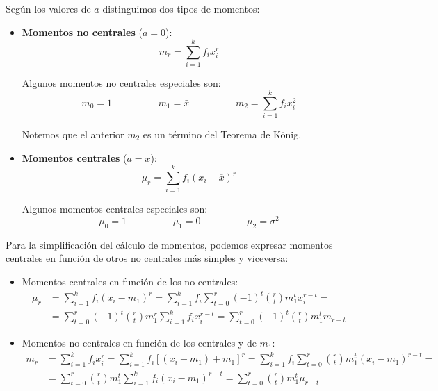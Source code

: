 Según los valores de $a$ distinguimos dos tipos de momentos:
\begin{itemize}
    \item \textbf{Momentos no centrales} ($a=0$):
        $$m_r = \sum_{i=1}^k f_i x_i^r$$

        Algunos momentos no centrales especiales son:
        $$m_0 = 1 \hspace{2cm} m_1 = \bar{x} \hspace{2cm} m_2 = \sum_{i=1}^k f_i x_i^2$$
\begin{observacion}
    Notemos que el anterior $m_2$ es un término del Teorema de König.
\end{observacion}

    \item \textbf{Momentos centrales} ($a=\overline{x}$):
        $$\mu_r = \sum_{i=1}^k f_i (x_i - \overline{x})^r$$

        Algunos momentos centrales especiales son:
        $$\mu_0 = 1 \hspace{2cm} \mu_1 = 0 \hspace{2cm} \mu_2 = \sigma^2$$
\end{itemize}


Para la simplificación del cálculo de momentos, podemos expresar momentos centrales en función de otros
no centrales más simples y viceversa:

\begin{itemize}
    \item Momentos centrales en función de los no centrales:
    \begin{equation*}
        \begin{split}
            \mu_r &= \sum_{i=1}^k f_i (x_i - m_1)^r = \sum_{i=1}^k f_i \sum_{t=0}^r (-1)^t \binom{r}{t} m_1^t x_i^{r-t}=\\
            &=\sum_{t=0}^r(-1)^t \binom{r}{t}m_1^r \sum_{i=1}^k f_i x_i^{r-t}=\sum_{t=0}^r (-1)^t \binom{r}{t}m_1^t m_{r-t}
        \end{split}
    \end{equation*}
    

    \item Momentos no centrales en función de los centrales y de $m_1$:
    \begin{equation*}
        \begin{split}
            m_r &= \sum_{i=1}^k f_ix_i^r=\sum_{i=1}^kf_i [(x_i-m_1)+m_1]^r = \sum_{i=1}^k f_i \sum_{t=0}^r \binom{r}{t}m_1^t (x_i - m_1)^{r-t}=\\
            &=\sum_{t=0}^r \binom{r}{t} m_1^t \sum_{i=1}^k f_i (x_i - m_1)^{r-t}=\sum_{t=0}^r \binom{r}{t} m_1^t \mu_{r-t}
        \end{split}
    \end{equation*}
\end{itemize}

